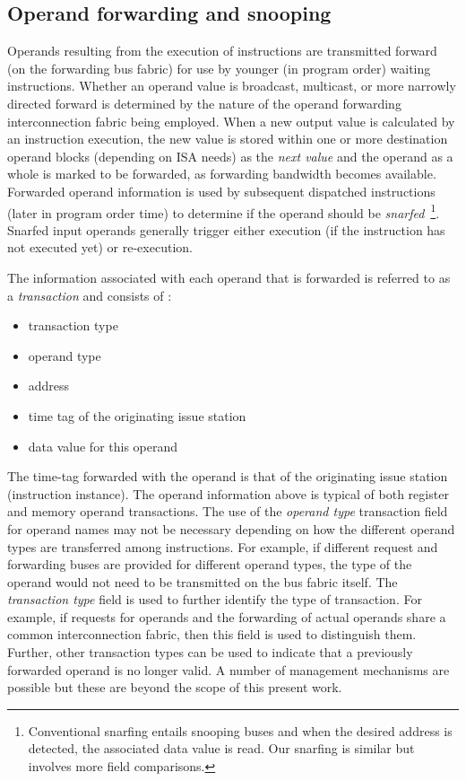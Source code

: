 \documentclass[10pt,dvips]{article}
\begin{document}
\subsection{Operand forwarding and snooping}
%
Operands resulting from the execution of instructions
are transmitted forward (on the forwarding bus fabric)
for use by younger (in program order) waiting instructions.
Whether an operand value is broadcast, multicast, or more narrowly
directed forward
is determined by the nature of the operand forwarding interconnection
fabric being employed.
When a new output value is calculated by an instruction execution,
the new value is stored within one or more destination operand blocks
(depending on ISA needs) as
the \textit{next value} and the operand as a whole
is marked to be forwarded, as forwarding bandwidth becomes
available.
Forwarded operand information is used by subsequent 
dispatched instructions 
(later in program order time)
to determine if
the operand should be {\em snarfed}~\footnote{Conventional
snarfing entails snooping
buses and when the desired address is detected, 
the associated data value is read.  Our snarfing is
similar but involves more field comparisons.}.
Snarfed input operands generally trigger either execution
(if the instruction has not executed yet)
or re-execution.

The information associated with each operand that is
forwarded is referred
to as a {\em transaction} and consists of :
%
\begin{itemize}
\vspace{-0.10in}
\item{transaction type}
\vspace{-0.10in}
\item{operand type}
\vspace{-0.10in}
\item{address}
\vspace{-0.10in}
\item{time tag of the originating issue station}
\vspace{-0.10in}
\item{data value for this operand}
\vspace{-0.10in}
\end{itemize}   
%
The time-tag forwarded with the operand is that of the originating
issue station (instruction instance).
The operand information above is typical of both
register and memory operand transactions.
The use of the \textit{operand type} transaction field 
for operand names may not be
necessary depending on how the different operand types
are transferred among instructions.
For example, if different request and forwarding buses are
provided for different operand types, the type of the operand
would not need to be transmitted on the bus fabric itself.
The \textit{transaction type} field is used to further
identify the type of transaction.  
For example, if requests for operands and the forwarding of
actual operands share a common interconnection fabric, then
this field is used to distinguish them.
Further, other transaction types can be used to indicate that
a previously forwarded operand is no longer valid.
A number of management mechanisms are possible but
these are beyond the scope of this present work.
\end{document}
